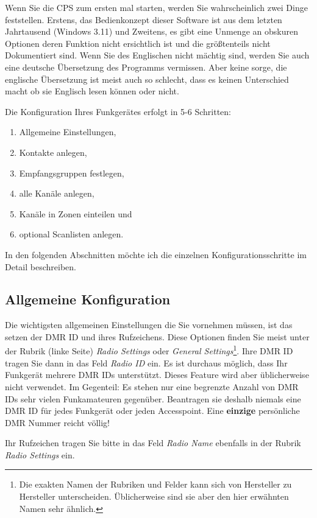 Wenn Sie die CPS zum ersten mal starten, werden Sie wahrscheinlich zwei Dinge feststellen. Erstens, das Bedienkonzept dieser Software ist aus dem letzten Jahrtausend (Windows 3.11) und Zweitens, es gibt eine Unmenge an obskuren Optionen deren Funktion nicht ersichtlich ist und die größtenteils nicht Dokumentiert sind. Wenn Sie des Englischen nicht mächtig sind, werden Sie auch eine deutsche Übersetzung des Programms vermissen. Aber keine sorge, die englische Übersetzung ist meist auch so schlecht, dass es keinen Unterschied macht ob sie Englisch lesen können oder nicht.

Die Konfiguration Ihres Funkgerätes erfolgt in 5-6 Schritten:
\begin{enumerate}
 \item Allgemeine Einstellungen,
 \item Kontakte anlegen,
 \item Empfangsgruppen festlegen,
 \item alle Kanäle anlegen,
 \item Kanäle in Zonen einteilen und
 \item optional Scanlisten anlegen.
\end{enumerate}

In den folgenden Abschnitten möchte ich die einzelnen Konfigurationsschritte im Detail beschreiben.

\subsection{Allgemeine Konfiguration} \label{sec:cp:basic}
Die wichtigsten allgemeinen Einstellungen die Sie vornehmen müssen, ist das setzen der DMR ID und ihres Rufzeichens. Diese Optionen finden Sie meist unter der Rubrik (linke Seite) \emph{Radio Settings} oder \emph{General Settings}\footnote{Die exakten Namen der Rubriken und Felder kann sich von Hersteller zu Hersteller unterscheiden. Üblicherweise sind sie aber den hier erwähnten Namen sehr ähnlich.}. Ihre DMR ID tragen Sie dann in das Feld \emph{Radio ID} ein. Es ist durchaus möglich, dass Ihr Funkgerät mehrere DMR IDs unterstützt. Dieses Feature wird aber üblicherweise nicht verwendet. Im Gegenteil: Es stehen nur eine begrenzte Anzahl von DMR IDs sehr vielen Funkamateuren gegenüber. Beantragen sie deshalb niemals eine DMR ID für jedes Funkgerät oder jeden Accesspoint. Eine \textbf{einzige} persönliche DMR Nummer reicht völlig! 

Ihr Rufzeichen tragen Sie bitte in das Feld \emph{Radio Name} ebenfalls in der Rubrik \emph{Radio Settings} ein.  

